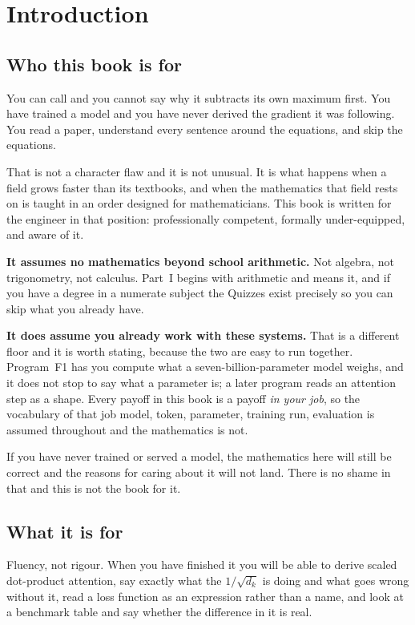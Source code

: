 \chapter*{Introduction}
{}

\section*{Who this book is for}

You can call  and you cannot say why it subtracts its own maximum
first. You have trained a model and you have never derived the gradient it was
following. You read a paper, understand every sentence around the equations,
and skip the equations.

That is not a character flaw and it is not unusual. It is what happens when a
field grows faster than its textbooks, and when the mathematics that field
rests on is taught in an order designed for mathematicians. This book is
written for the engineer in that position: professionally competent, formally
under-equipped, and aware of it.

\textbf{It assumes no mathematics beyond school arithmetic.} Not algebra, not
trigonometry, not calculus. Part~I begins with arithmetic and means it, and if
you have a degree in a numerate subject the Quizzes exist precisely so you can
skip what you already have.

\textbf{It does assume you already work with these systems.} That is a
different floor and it is worth stating, because the two are easy to run
together. Program~F1 has you compute what a seven-billion-parameter model
weighs, and it does not stop to say what a parameter is; a later program reads
an attention step as a shape. Every payoff in this book is a payoff \emph{in
your job}, so the vocabulary of that job \dash{} model, token, parameter,
training run, evaluation \dash{} is assumed throughout and the mathematics is
not.

If you have never trained or served a model, the mathematics here will still
be correct and the reasons for caring about it will not land. There is no
shame in that and this is not the book for it.

\section*{What it is for}

Fluency, not rigour. When you have finished it you will be able to derive
scaled dot-product attention, say exactly what the $1/\sqrt{d_k}$ is doing and
what goes wrong without it, read a loss function as an expression rather than a
name, and look at a benchmark table and say whether the difference in it is
real.

